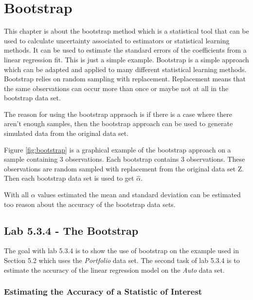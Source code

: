 \chapter{Bootstrap}
\label{chp:boots}

This chapter is about the bootstrap method which is a statistical tool that can be used to calculate uncertainty associated to estimators or statistical learning methods. It can be used to estimate the standard errors of the coefficients from a linear regression fit. This is just a simple example. Bootstrap is a simple approach which can be adapted and applied to many different statistical learning methods. Bootstrap relies on random sampling with replacement. Replacement means that the same observations can occur more than once or maybe not at all in the bootstrap data set. 

The reason for using the bootstrap appraoch is if there is a case where there aren't enough samples, then the bootstrap approach can be used to generate simulated data from the original data set.


Figure \ref{fig:bootstrap} is a graphical example of the bootstrap approach on a sample containing 3 observations. Each bootstrap contains 3 observations. These observations are random sampled with replacement from the original data set Z. Then each bootstrap data set is used to get $\hat{\alpha}$.

With all $\alpha$ values estimated the mean and standard deviation can be estimated too reason about the accuracy of the bootstrap data sets.

\section{Lab 5.3.4 - The Bootstrap}

The goal with lab 5.3.4 is to show the use of bootstrap on the example used in Section 5.2\citep{ISLR} which uses the \emph{Portfolio} data set. The second task of lab 5.3.4 is to estimate the accuracy of the linear regression model on the \emph{Auto} data set.

\subsection{Estimating the Accuracy of a Statistic of Interest}

